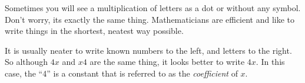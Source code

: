       \label{m38346*id172791}Sometimes you will see a multiplication of letters as a dot or
without any symbol. Don't worry, its exactly the same thing. Mathematicians are
efficient and like to write things in the shortest, neatest way possible.\par 
      \label{m38346*uid9}\nopagebreak\noindent{}
      \label{m38346*id172875}It is usually neater to write known numbers to the left, and letters to the
right. So although $4x$ and $x4$ are the same thing, it looks better to
write $4x$. In this case, the ``4'' is a constant that is referred to as the
\textsl{coefficient} of $x$.\par 
\label{m38346*secfhsst!!!underscore!!!id440}
